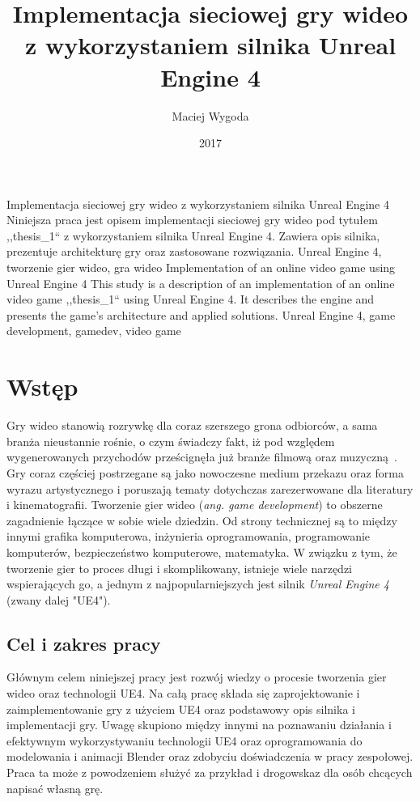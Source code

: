 \documentclass[multip]{SGGW-thesis}
\title{Implementacja sieciowej gry wideo z wykorzystaniem silnika Unreal Engine 4}
\author{Maciej Wygoda}
\date{2017}
\begin{document}
\maketitle
{}
\statementpage
\abstractpage
{Implementacja sieciowej gry wideo z wykorzystaniem silnika Unreal Engine 4}
{Niniejsza praca jest opisem implementacji sieciowej gry wideo pod tytułem ,,thesis\_1`` z wykorzystaniem silnika Unreal Engine 4. Zawiera opis silnika, prezentuje architekturę gry oraz zastosowane rozwiązania.}
{Unreal Engine 4, tworzenie gier wideo, gra wideo}
{Implementation of an online video game using Unreal Engine 4}
{This study is a description of an implementation of an online video game ,,thesis\_1`` using Unreal Engine 4. It describes the engine and presents the game's architecture and applied solutions.}
{Unreal Engine 4, game development, gamedev, video game}

\tableofcontents

\chapter{Wstęp}
Gry wideo stanowią rozrywkę dla coraz szerszego grona odbiorców, a sama branża nieustannie rośnie, o czym świadczy fakt, iż pod względem wygenerowanych przychodów prześcignęła już branże filmową oraz muzyczną~\cite{nasdaq-video-games-industry}. Gry coraz częściej postrzegane są jako nowoczesne medium przekazu oraz forma wyrazu artystycznego i poruszają tematy dotychczas zarezerwowane dla literatury i kinematografii. 
\newline \indent Tworzenie gier wideo ({\em ang. game development}) to obszerne zagadnienie łączące w sobie wiele dziedzin. Od strony technicznej są to między innymi grafika komputerowa, inżynieria oprogramowania, programowanie komputerów, bezpieczeństwo komputerowe, matematyka. W związku z tym, że tworzenie gier to proces długi i skomplikowany, istnieje wiele narzędzi wspierających go, a jednym z najpopularniejszych jest silnik {\em Unreal Engine 4} (zwany dalej "UE4").
\section{Cel i zakres pracy}
Głównym celem niniejszej pracy jest rozwój wiedzy o procesie tworzenia gier wideo oraz technologii UE4.  Na całą pracę składa się zaprojektowanie i zaimplementowanie gry z użyciem UE4 oraz podstawowy opis silnika i implementacji gry. 
\newline \indent Uwagę skupiono między innymi na poznawaniu działania i efektywnym wykorzystywaniu technologii UE4 oraz oprogramowania do modelowania i animacji Blender oraz zdobyciu doświadczenia w pracy zespołowej.
Praca ta może z powodzeniem służyć za przykład i drogowskaz dla osób chcących napisać własną grę.
\end{document}
